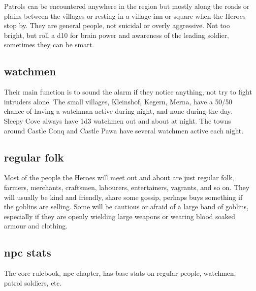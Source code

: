 Patrols can be encountered anywhere in the region but mostly along the roads or plains between the villages or resting in a village inn or square when the Heroes stop by. They are general people, not suicidal or overly aggressive. Not too bright, but roll a d10 for brain power and awareness of the leading soldier, sometimes they can be smart.


\subsection*{watchmen}

Their main function is to sound the alarm if they notice anything, not try to fight intruders alone. 
The small villages, Kleinshof, Kegern, Merna, have a 50/50 chance of having a watchman active during night, and none during the day. Sleepy Cove always have 1d3 watchmen out and about at night. 
The towns around Castle Conq and Castle Pawa have several watchmen active each night.


\subsection*{regular folk}

Most of the people the Heroes will meet out and about are just regular folk, farmers, merchants, craftsmen, labourers, entertainers, vagrants, and so on. They will usually be kind and friendly, share some gossip, perhaps buys something if the goblins are selling. Some will be cautious or afraid of a large band of goblins, especially if they are openly wielding large weapons or wearing blood soaked armour and clothing.


\subsection*{npc stats}

The core rulebook, npc chapter, has base stats on regular people, watchmen, patrol soldiers, etc.


























\clearpage
\raggedbottom
